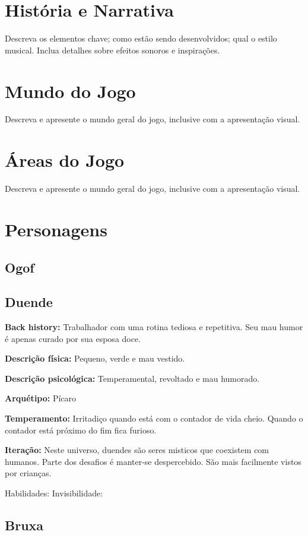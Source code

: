 
\section{História e Narrativa}

Descreva os elementos chave; como estão sendo desenvolvidos; qual o estilo musical. Inclua detalhes sobre efeitos sonoros e inspirações.

\section{Mundo do Jogo}

Descreva e apresente o mundo geral do jogo, inclusive com a apresentação visual.

\section{Áreas do Jogo}

Descreva e apresente o mundo geral do jogo, inclusive com a apresentação visual.


\section{Personagens}

\subsection{Ogof}
\subsection{Duende}
\textbf{Back history:} Trabalhador com uma rotina tediosa e repetitiva. Seu mau humor é apenas curado por sua esposa doce.

\textbf{Descrição física:} Pequeno, verde e mau vestido.

\textbf{Descrição psicológica:} Temperamental, revoltado e mau humorado.

\textbf{Arquétipo:} Pícaro

\textbf{Temperamento:} Irritadiço quando está com o contador de vida cheio. Quando o contador está próximo do fim fica furioso.

\textbf{Iteração: } Neste universo, duendes são seres misticos que coexistem com humanos. Parte dos desafios é manter-se despercebido. São mais facilmente vistos por crianças.

Habilidades:  Invisibilidade: 

\subsection{Bruxa}

